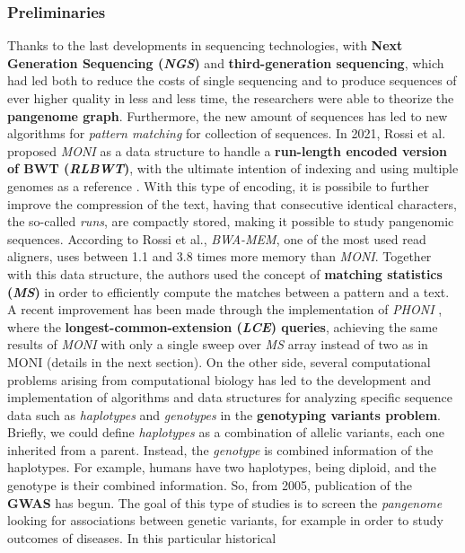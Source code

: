 \documentclass[a4paper,11pt, oneside]{article}
\begin{document}
\subsubsection*{Preliminaries}
Thanks to the last developments in sequencing technologies, with \textbf{Next
  Generation Sequencing (\textit{NGS})} and \textbf{third-generation
  sequencing}, which had led both to reduce the costs of single sequencing and
to produce sequences of ever higher quality in less and less time, the
researchers were able to theorize the \textbf{pangenome graph}. Furthermore, the
new amount of sequences has led to new algorithms for \textit{pattern matching}
for collection of sequences. In 2021, Rossi et al. proposed \textit{MONI} as a
data structure to handle a \textbf{run-length encoded version of BWT
  (\textit{RLBWT})}, with the ultimate intention of indexing and using multiple
genomes as a reference \cite{moni}. With this type of encoding, it is possibile
to further improve the compression of the text, having that consecutive
identical characters, the so-called \textit{runs}, are compactly stored, making
it possible to study pangenomic sequences. According to Rossi et al.,
\textit{BWA-MEM}, one of the most used read aligners, uses between 1.1 and 3.8
times more memory than \textit{MONI}. Together with this data structure, the
authors used the concept of \textbf{matching statistics (\textit{MS})} in order
to efficiently compute the matches between a pattern and a text. A recent
improvement has been made through the implementation of \textit{PHONI}
\cite{phoni}, where the \textbf{longest-common-extension (\textit{LCE})
  queries}, achieving the same results of \textit{MONI} with only a single sweep
over \textit{MS} array instead of two as in MONI (details in the next section).
On the other side, several computational problems arising from computational
biology has led to the development and implementation of algorithms and data
structures for analyzing specific sequence data such as \textit{haplotypes} and
\textit{genotypes} in the \textbf{genotyping variants problem}. Briefly, we
could define \textit{haplotypes} as a combination of allelic variants, each one
inherited from a parent. Instead, the \textit{genotype} is combined information
of the haplotypes. For example, humans have two haplotypes, being diploid, and
the genotype is their combined information. So, from 2005, publication of the
\textbf{GWAS} has begun. The goal of this type of studies is to screen the
\textit{pangenome} looking for associations between genetic variants, for
example in order to study outcomes of diseases.  In this particular historical
\end{document}
